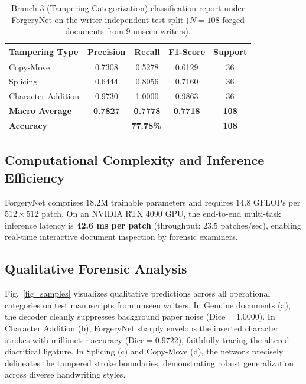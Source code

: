 \documentclass[runningheads]{llncs}
\begin{document}
\begin{table}[t]
\caption{Branch 3 (Tampering Categorization) classification report under ForgeryNet on the writer-independent test split ($N = 108$ forged documents from 9 unseen writers).}\label{tab_type}
\centering
\setlength{\tabcolsep}{6pt}
\begin{tabular}{lcccc}
\toprule
\textbf{Tampering Type} & \textbf{Precision} & \textbf{Recall} & \textbf{F1-Score} & \textbf{Support} \\
\midrule
Copy-Move           & 0.7308 & 0.5278 & 0.6129 & 36 \\
Splicing            & 0.6444 & 0.8056 & 0.7160 & 36 \\
Character Addition  & 0.9730 & 1.0000 & 0.9863 & 36 \\
\midrule
\textbf{Macro Average} & \textbf{0.7827} & \textbf{0.7778} & \textbf{0.7718} & \textbf{108} \\
\textbf{Accuracy}      & \multicolumn{3}{c}{\textbf{77.78\%}} & \textbf{108} \\
\bottomrule
\end{tabular}
\end{table}

\subsection{Computational Complexity and Inference Efficiency}\label{subsec5_5}
ForgeryNet comprises $18.2\text{M}$ trainable parameters and requires $14.8\text{ GFLOPs}$ per $512 \times 512$ patch. On an NVIDIA RTX 4090 GPU, the end-to-end multi-task inference latency is \textbf{42.6 ms per patch} (throughput: $23.5\text{ patches/sec}$), enabling real-time interactive document inspection by forensic examiners.

\subsection{Qualitative Forensic Analysis}\label{subsec5_6}
Fig.~\ref{fig_samples} visualizes qualitative predictions across all operational categories on test manuscripts from unseen writers. In Genuine documents (a), the decoder cleanly suppresses background paper noise ($\text{Dice} = 1.0000$). In Character Addition (b), ForgeryNet sharply envelops the inserted character strokes with millimeter accuracy ($\text{Dice} = 0.9722$), faithfully tracing the altered diacritical ligature. In Splicing (c) and Copy-Move (d), the network precisely delineates the tampered stroke boundaries, demonstrating robust generalization across diverse handwriting styles.
\end{document}
